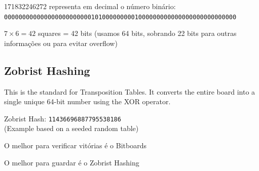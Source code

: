 \documentclass[12pt, titlepage]{article}
\begin{document}
    171832246272 representa em decimal o número binário:\\
    \texttt{0000000000000000000000001010000000001000000000000000000000000000}

    $7 \times 6 = 42$ squares = 42 bits (usamos 64 bits, sobrando 22 bits para outras informações ou para evitar overflow)

    \subsection{Zobrist Hashing}
    This is the standard for Transposition Tables. It converts the entire board into a single unique 64-bit number using the XOR operator.

    \begin{center}
        Zobrist Hash: \texttt{11436696887795538186}\\
        (Example based on a seeded random table)
    \end{center}

O melhor para verificar vitórias é o Bitboards

O melhor para guardar é o Zobrist Hashing
\end{document}
